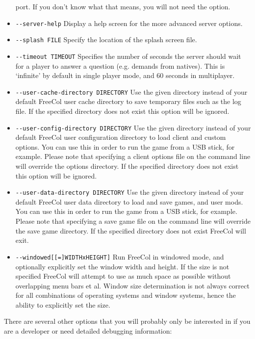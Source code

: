 \documentclass[12pt]{book}
\begin{document}
\begin{itemize}
port. If you don't know what that means, you will not need the option.
\item\verb$--server-help$ Display a help screen for the more advanced
server options.
\item\verb$--splash FILE$ Specify the location of the splash screen file.
\item\verb$--timeout TIMEOUT$ Specifies the number of seconds the
  server should wait for a player to answer a question (e.g. demands
  from natives).  This is `infinite' by default in single player mode,
  and 60 seconds in multiplayer.
\item\verb$--user-cache-directory DIRECTORY$ Use the given directory
  instead of your default FreeCol user cache directory to save
  temporary files such as the log file.  If the specified directory does not
  exist this option will be ignored.
\item\verb$--user-config-directory DIRECTORY$ Use the given directory
  instead of your default FreeCol user configuration directory to load
  client and custom options. You can use this in order to run the
  game from a USB stick, for example.  Please note
  that specifying a client options file on the command line will override
  the options directory.  If the specified directory does not
  exist this option will be ignored.
\item\verb$--user-data-directory DIRECTORY$ Use the given directory
  instead of your default FreeCol user data directory to load and save
  games, and user mods. You can use this in order to run the
  game from a USB stick, for example. Please note
  that specifying a save game file on the command line will override
  the save game directory.  If the specified directory does not
  exist FreeCol will exit.
\item\verb$--windowed[[=]WIDTHxHEIGHT]$ Run FreeCol in windowed mode,
  and optionally explicitly set the window width and height. If the
  size is not specified FreeCol will attempt to use as much space as
  possible without overlapping menu bars et al.  Window size
  determination is not always correct for all combinations of
  operating systems and window systems, hence the ability to
  explicitly set the size.
\end{itemize}

There are several other options that you will probably only be
interested in if you are a developer or need detailed debugging
information:
\end{document}
